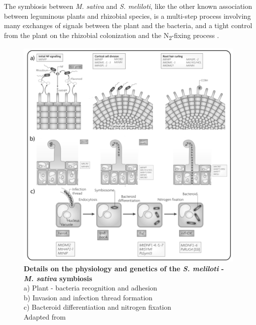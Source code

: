The symbiosis between \textit{M. sativa} and \textit{S. meliloti}, like the other known association between leguminous plants and rhizobial species, is a multi-step process involving many exchanges of signals between the plant and the bacteria, and a tight control from the plant on the rhizobial colonization and the N\textsubscript{2}-fixing process \cite{jones2007rhizobial}.

\begin{figure}[!h]
	\center
    \includegraphics[width=1\textwidth]{figures/Introduction/thesis_17}
	\caption{\label{fig:symbiosis}\textbf{Details on the physiology and genetics of the \textit{S. meliloti} - \textit{M. sativa} symbiosis}\\
			a) Plant - bacteria recognition and adhesion\\
			b) Invasion and infection thread formation\\
			c) Bacteroid differentiation and nitrogen fixation\\
			Adapted from \cite{jones2007rhizobial}}
\end{figure}

